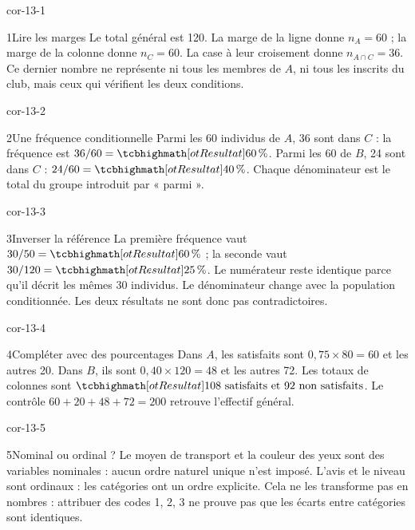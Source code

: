 \clearpage\pagestyle{otMain}\fontsize{11}{15}\selectfont
{}
\begin{blocLivre}{cor-13-1}
\begin{corrige}{1}{Lire les marges}
Le total général est 120. La marge de la ligne donne $n_A=60$ ; la marge de la colonne donne $n_C=60$. La case à leur croisement donne $n_{A\cap C}=36$. Ce dernier nombre ne représente ni tous les membres de $A$, ni tous les inscrits du club, mais ceux qui vérifient les deux conditions.
\end{corrige}
\end{blocLivre}
\begin{blocLivre}{cor-13-2}
\begin{corrige}{2}{Une fréquence conditionnelle}
Parmi les 60 individus de $A$, 36 sont dans $C$ : la fréquence est $36/60=\res{60\,\%}$. Parmi les 60 de $B$, 24 sont dans $C$ : $24/60=\res{40\,\%}$. Chaque dénominateur est le total du groupe introduit par « parmi ».
\end{corrige}
\end{blocLivre}
\begin{blocLivre}{cor-13-3}
\begin{corrige}{3}{Inverser la référence}
La première fréquence vaut $30/50=\res{60\,\%}$ ; la seconde vaut $30/120=\res{25\,\%}$. Le numérateur reste identique parce qu’il décrit les mêmes 30 individus. Le dénominateur change avec la population conditionnée. Les deux résultats ne sont donc pas contradictoires.
\end{corrige}
\end{blocLivre}
\begin{blocLivre}{cor-13-4}
\begin{corrige}{4}{Compléter avec des pourcentages}
Dans $A$, les satisfaits sont $0{,}75\times80=60$ et les autres 20. Dans $B$, ils sont $0{,}40\times120=48$ et les autres 72. Les totaux de colonnes sont $\res{108\text{ satisfaits et }92\text{ non satisfaits}}$. Le contrôle $60+20+48+72=200$ retrouve l’effectif général.
\end{corrige}
\end{blocLivre}
\begin{blocLivre}{cor-13-5}
\begin{corrige}{5}{Nominal ou ordinal ?}
Le moyen de transport et la couleur des yeux sont des variables nominales : aucun ordre naturel unique n’est imposé. L’avis et le niveau sont ordinaux : les catégories ont un ordre explicite. Cela ne les transforme pas en nombres : attribuer des codes 1, 2, 3 ne prouve pas que les écarts entre catégories sont identiques.
\end{corrige}
\end{blocLivre}
